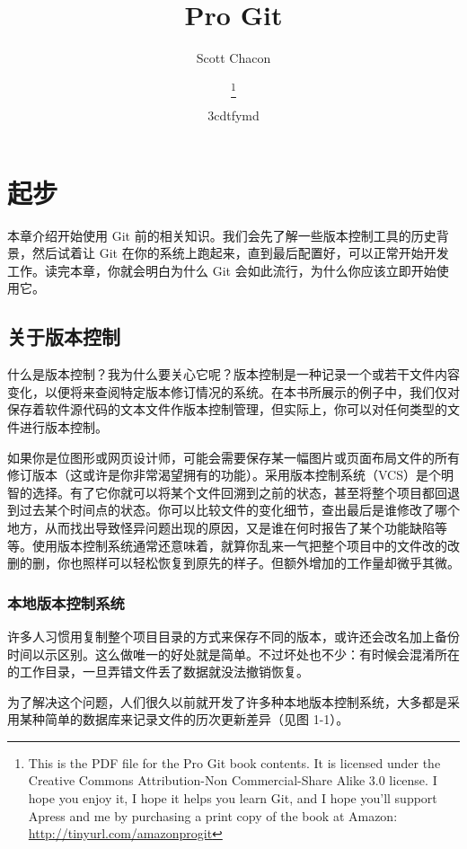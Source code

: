 \documentclass[a4paper]{book}
\title{Pro Git}
\author{Scott Chacon}
\title{\textbf{\savedtitle}}
\author{\textbf{\savedauthor}\thanks{This is the PDF file for the Pro Git book contents. It is licensed under the Creative Commons Attribution-Non Commercial-Share Alike 3.0 license. I hope you enjoy it, I hope it helps you learn Git, and I hope you'll support Apress and me by purchasing a print copy of the book at Amazon: \url{http://tinyurl.com/amazonprogit}}}
\date{\w3cdtfymd}
\makeatletter
\let\savedauthor=\@author
\let\savedtitle=\@title
\newcounter{tab}[chapter]
\newcommand{\chap}[1]{\newpage\thispagestyle{empty}\chapter{#1}\label{chap:\thechapter}}
\makeatother
\begin{document}
\frontmatter
\maketitle
\thispagestyle{empty}
\setcounter{tocdepth}{4}
\tableofcontents\newpage\thispagestyle{empty}

\mainmatter
\fancyhf{}
\fancyhead[LE]{{\small\leftmark}}
\fancyhead[RO]{{\small\rightmark}}
\fancyhead[RE,LO]{{\small\savedauthor\hspace*{1ex}\textbf{\savedtitle}}}
\fancyfoot[LE,RO]{\small\textbf\thepage}
\pagestyle{fancy}

\chap{起步}

本章介绍开始使用 Git 前的相关知识。我们会先了解一些版本控制工具的历史背景，然后试着让 Git 在你的系统上跑起来，直到最后配置好，可以正常开始开发工作。读完本章，你就会明白为什么 Git 会如此流行，为什么你应该立即开始使用它。

\section{关于版本控制}

什么是版本控制？我为什么要关心它呢？版本控制是一种记录一个或若干文件内容变化，以便将来查阅特定版本修订情况的系统。在本书所展示的例子中，我们仅对保存着软件源代码的文本文件作版本控制管理，但实际上，你可以对任何类型的文件进行版本控制。

如果你是位图形或网页设计师，可能会需要保存某一幅图片或页面布局文件的所有修订版本（这或许是你非常渴望拥有的功能）。采用版本控制系统（VCS）是个明智的选择。有了它你就可以将某个文件回溯到之前的状态，甚至将整个项目都回退到过去某个时间点的状态。你可以比较文件的变化细节，查出最后是谁修改了哪个地方，从而找出导致怪异问题出现的原因，又是谁在何时报告了某个功能缺陷等等。使用版本控制系统通常还意味着，就算你乱来一气把整个项目中的文件改的改删的删，你也照样可以轻松恢复到原先的样子。但额外增加的工作量却微乎其微。

\subsection{本地版本控制系统}

许多人习惯用复制整个项目目录的方式来保存不同的版本，或许还会改名加上备份时间以示区别。这么做唯一的好处就是简单。不过坏处也不少：有时候会混淆所在的工作目录，一旦弄错文件丢了数据就没法撤销恢复。

为了解决这个问题，人们很久以前就开发了许多种本地版本控制系统，大多都是采用某种简单的数据库来记录文件的历次更新差异（见图 1-1）。
\end{document}
